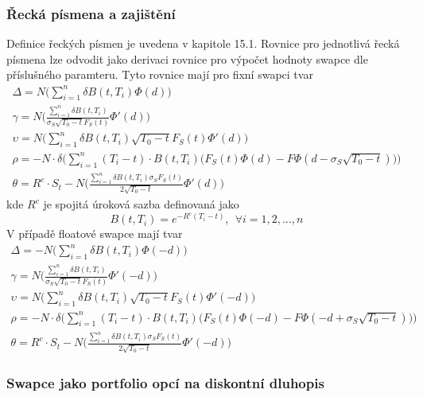 \documentclass[a4paper]{book}
\begin{document}
\subsubsection{Řecká písmena a zajištění}

Definice řeckých písmen je uvedena v kapitole 15.1. Rovnice pro jednotlivá řecká písmena lze odvodit jako derivaci rovnice pro výpočet hodnoty swapce dle příslušného paramteru. Tyto rovnice mají pro fixní swapci tvar
\begin{gather*}
\Delta = N \Bigg( \sum_{i=1}^n \delta B(t, T_i) \Phi(d) \Bigg) \\
\gamma = N \Bigg( \frac{\sum_{i = 1}^n \delta B(t, T_i)}{\sigma_S \sqrt{T_0 - t}F_S(t)}\Phi'(d) \Bigg) \\
\upsilon = N \Bigg( \sum_{i = 1}^n \delta B(t, T_i) \sqrt{T_0 - t}F_S(t)\Phi'(d) \Bigg) \\
\rho = - N \cdot \delta \Bigg( \sum_{i=1}^n (T_i - t) \cdot B(t, T_i) \big( F_S(t) \Phi(d) - F \Phi(d - \sigma_S \sqrt{T_0 - t})\big) \Bigg) \\
\theta = R^c \cdot S_t - N \Bigg( \frac{\sum_{i=1}^n \delta B(t, T_i) \sigma_S F_S(t)}{2 \sqrt{T_0 - t}} \Phi'(d) \Bigg)
\end{gather*}
kde $R^c$ je spojitá úroková sazba definovaná jako
\begin{equation*}
B(t, T_i) = e^{-R^c(T_i - t)},~~ \forall i = 1, 2, \dots, n
\end{equation*}
V případě floatové swapce mají tvar
\begin{gather*}
\Delta = -N \Bigg( \sum_{i=1}^n \delta B(t, T_i) \Phi(-d) \Bigg) \\
\gamma = N \Bigg( \frac{\sum_{i = 1}^n \delta B(t, T_i)}{\sigma_S \sqrt{T_0 - t}F_S(t)}\Phi'(-d) \Bigg) \\
\upsilon = N \Bigg( \sum_{i = 1}^n \delta B(t, T_i) \sqrt{T_0 - t}F_S(t)\Phi'(-d) \Bigg) \\
\rho = - N \cdot \delta \Bigg( \sum_{i=1}^n (T_i - t) \cdot B(t, T_i) \big( F_S(t) \Phi(-d) - F \Phi(-d + \sigma_S \sqrt{T_0 - t})\big) \Bigg) \\
\theta = R^c \cdot S_t - N \Bigg( \frac{\sum_{i=1}^n \delta B(t, T_i) \sigma_S F_S(t)}{2 \sqrt{T_0 - t}} \Phi'(-d) \Bigg)
\end{gather*}

\subsubsection{Swapce jako portfolio opcí na diskontní dluhopis}
\end{document}
